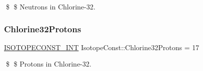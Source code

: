 \$ \$ Neutrons in Chlorine-\/32. \mbox{\label{group___isotope_const-_chlorine-_cl32_ga85bfe63dac24c281ec33a5bd34ea1083}} 
\subsubsection{\texorpdfstring{Chlorine32\+Protons}{Chlorine32Protons}}
{\footnotesize\ttfamily \mbox{\hyperlink{group___isotope_const-_macros_ga5f18360b3e99483a35c32d789e62621c}{I\+S\+O\+T\+O\+P\+E\+C\+O\+N\+S\+T\+\_\+\+I\+NT}} Isotope\+Const\+::\+Chlorine32\+Protons = 17}

\$ \$ Protons in Chlorine-\/32. 